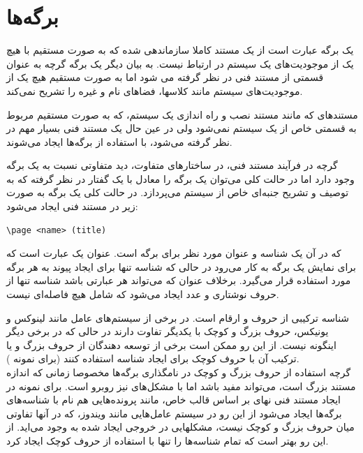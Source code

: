 

\section{برگه‌ها}

یک برگه عبارت است از یک مستند کاملا سازماندهی شده که به صورت مستقیم با هیچ یک از
موجودیت‌های یک سیستم در ارتباط نیست. به بیان دیگر یک برگه گرچه به عنوان قسمتی از
مستند فنی در نظر گرفته می شود اما به صورت مستقیم هیچ یک از موجودیت‌های سیستم
مانند کلاسها، فضاهای نام و غیره را تشریح نمی‌کند.

مستندهای که مانند مستند نصب و راه اندازی یک سیستم، که به صورت مستقیم مربوط به
قسمتی خاص از یک سیستم نمی‌شود ولی در عین حال یک مستند فنی بسیار مهم در نظر گرفته
می‌شود، با استفاده از برگه‌ها ایجاد می‌شوند.

گرچه در فرآیند مستند فنی، در ساختارهای متفاوت، دید متفاوتی نسبت به یک برگه وجود
دارد اما در حالت کلی می‌توان یک برگه را معادل با یک گفتار در نظر گرفته که به
توصیف و تشریح جنبه‌ای خاص از سیستم می‌پردازد. در حالت کلی یک برگه به صورت زیر در
مستند فنی ایجاد می‌شود:


\begin{latin}
\lstset{language=C++}  
\begin{lstlisting}[frame=single] 
\page <name> (title)
\end{lstlisting}
\end{latin}

که در آن  یک شناسه و  عنوان مورد نظر برای برگه است. عنوان
یک عبارت است که برای نمایش یک برگه به کار می‌رود در حالی که شناسه تنها برای
ایجاد پیوند به هر برگه مورد استفاده قرار می‌گیرد. برخلاف عنوان که می‌تواند هر
عبارتی باشد شناسه تنها از حروف نوشتاری و عدد ایجاد می‌شود که شامل هیچ فاصله‌ای
نیست.

\begin{note}
شناسه ترکیبی از حروف و ارقام است. در برخی از سیستم‌های عامل مانند لینوکس و
یونیکس، حروف بزرگ و کوچک با یکدیگر تفاوت دارند در حالی که در برخی دیگر اینگونه
نیست. از این رو ممکن است برخی از توسعه دهندگان از حروف بزرگ و یا ترکیب آن با
حروف کوچک برای ایجاد شناسه استفاده کنند (برای نمونه ). 
\\%
گرچه استفاده از حروف بزرگ و کوچک در نامگذاری برگه‌ها مخصوصا زمانی که اندازه
مستند بزرگ است، می‌تواند مفید باشد اما با مشکل‌های نیز روبرو است. برای نمونه در
ایجاد مستند فنی نهای بر اساس قالب خاص، مانند  پرونده‌هایی هم نام با
شناسه‌های برگه‌ها ایجاد می‌شود از این رو در سیستم عامل‌هایی مانند ویندوز، که در
آنها تفاوتی میان حروف بزرگ و کوچک نیست، مشکلهایی در خروجی ایجاد شده به وجود
می‌اید. از این رو بهتر است که تمام شناسه‌ها را تنها با استفاده از حروف کوچک
ایجاد کرد.
\end{note}

